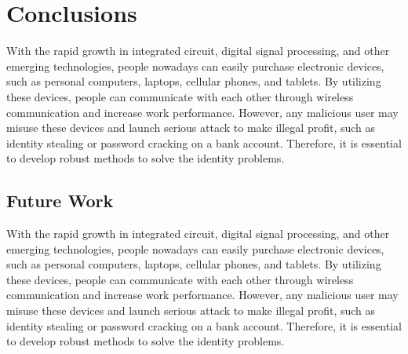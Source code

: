 \chapter{Conclusions}
\label{cha:3_conclusions}

With the rapid growth in integrated circuit, digital signal processing, and other emerging technologies, people nowadays can easily purchase electronic devices, such as personal computers, laptops, cellular phones, and tablets.  
By utilizing these devices, people can communicate with each other through wireless communication and increase work performance.      
However, any malicious user may misuse these devices and launch serious attack to make illegal profit, such as identity stealing or password cracking on a bank account.
Therefore, it is essential to develop robust methods to solve the identity problems.

\section{Future Work} 
\label{sec:3_future_work}
With the rapid growth in integrated circuit, digital signal processing, and other emerging technologies, people nowadays can easily purchase electronic devices, such as personal computers, laptops, cellular phones, and tablets.  
By utilizing these devices, people can communicate with each other through wireless communication and increase work performance.      
However, any malicious user may misuse these devices and launch serious attack to make illegal profit, such as identity stealing or password cracking on a bank account.
Therefore, it is essential to develop robust methods to solve the identity problems.
